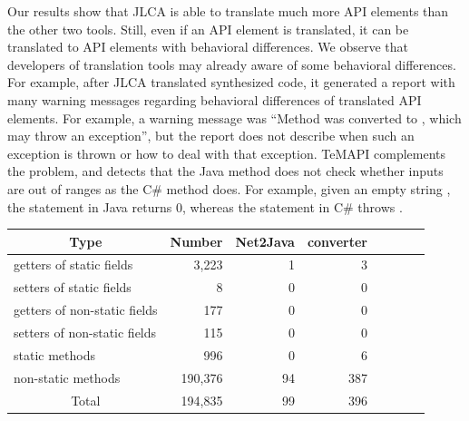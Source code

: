 Our results show that JLCA is able to translate much more API elements than the other two tools. Still, even if an API element is translated, it can be translated to API elements with behavioral differences. We observe that developers of translation tools may already aware of some behavioral differences. For example, after JLCA translated synthesized code, it generated a report with many warning messages regarding behavioral differences of translated API elements. For example, a warning message was ``Method  was converted to , which may throw an exception'', but the report does not describe when such an exception is thrown or how to deal with that exception. TeMAPI complements the problem, and detects that the Java method does not check whether inputs are out of ranges as the C\# method does. For example, given an empty string , the  statement in Java returns 0, whereas the  statement in C\# throws .
\begin{table}[t]
\centering
\begin{SmallOut}
\begin {tabular} {|l|r|r|r|r|r|c|c|}
 \hline
\multicolumn{1}{|c}{\textbf{Type}} & \multicolumn{1}{|c}{\textbf{Number}}
& \multicolumn{1}{|c|}{\textbf{Net2Java}} & \multicolumn{1}{|c|}{\textbf{converter}}\\
\hline
getters of static fields      &  3,223 & 1    &  3     \\
\hline
setters of static fields      &  8    & 0    &  0       \\
\hline
getters of non-static fields  &   177 & 0    &  0    \\
\hline
setters of non-static fields  &   115 & 0    &  0    \\
\hline
static methods                &   996 & 0    &  6  \\
\hline
non-static methods            &190,376& 94    &  387     \\
\hline
\multicolumn{1}{|c|}{Total}   &194,835& 99     &  396 \\
\hline
\end{tabular}%
 \label{table:csharp2java}
\end{SmallOut}\vspace*{-6ex}
\end{table}


